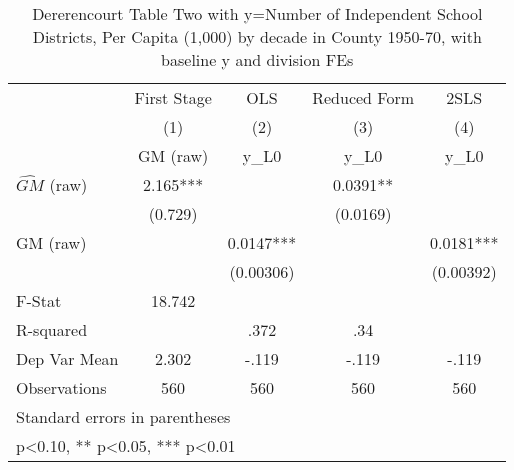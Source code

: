 \begin{table}[htbp]\centering
\def\sym#1{\ifmmode^{#1}\else\(^{#1}\)\fi}
\caption{Dererencourt Table Two with y=Number of Independent School Districts, Per Capita (1,000) by decade in County 1950-70, with baseline y and division FEs}
\begin{tabular}{l*{4}{c}}
\toprule
                    & First Stage   &         OLS   &Reduced Form   &        2SLS   \\
                    &\multicolumn{1}{c}{(1)}&\multicolumn{1}{c}{(2)}&\multicolumn{1}{c}{(3)}&\multicolumn{1}{c}{(4)}\\
                    &\multicolumn{1}{c}{GM  (raw)}&\multicolumn{1}{c}{y\_L0}&\multicolumn{1}{c}{y\_L0}&\multicolumn{1}{c}{y\_L0}\\
\midrule
$\hat{GM}$ (raw)    &       2.165***&               &      0.0391** &               \\
                    &     (0.729)   &               &    (0.0169)   &               \\
\addlinespace
GM  (raw)           &               &      0.0147***&               &      0.0181***\\
                    &               &   (0.00306)   &               &   (0.00392)   \\
\midrule
F-Stat              &      18.742   &               &               &               \\
R-squared           &               &        .372   &         .34   &               \\
Dep Var Mean        &       2.302   &       -.119   &       -.119   &       -.119   \\
Observations        &         560   &         560   &         560   &         560   \\
\bottomrule
\multicolumn{5}{l}{\footnotesize Standard errors in parentheses}\\
\multicolumn{5}{l}{\footnotesize * p<0.10, ** p<0.05, *** p<0.01}\\
\end{tabular}
\end{table}
